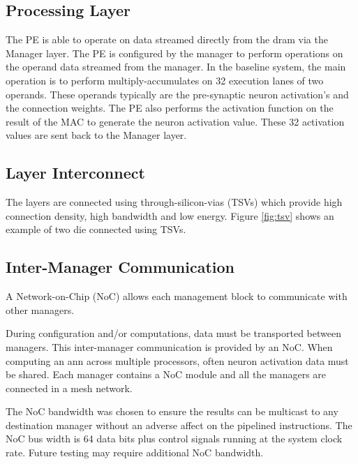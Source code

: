 \documentclass[journal]{IEEEtran}
\begin{document}
\subsection{Processing Layer}
\label{ssec:Processing Layer}
The PE is able to operate on data streamed directly from the \ac{dram} via the Manager layer. The PE is configured by the manager to perform operations on the operand data streamed from the manager. In the baseline system, the main operation is to perform multiply-accumulates on 32 execution lanes of two operands. These operands typically are the pre-synaptic neuron activation's and the connection weights. The PE also performs the activation function on the result of the MAC to generate the neuron activation value. These 32 activation values are sent back to the Manager layer.

\subsection{Layer Interconnect}
\label{ssec:Layer Interconnect}

The layers are connected using through-silicon-vias (TSVs) which provide high connection density, high bandwidth and low energy.
Figure \ref{fig:tsv} shows an example of two die connected using TSVs.

\subsection{Inter-Manager Communication}
\label{ssec:Inter-Manager Communication}

A Network-on-Chip (NoC) allows each management block to communicate with other managers.

During configuration and/or computations, data must be transported between managers. This inter-manager communication is provided by an NoC.
When computing an \ac{ann} across multiple processors, often neuron activation data must be shared. 
Each manager contains a NoC module and all the managers are connected in a mesh network.

The NoC bandwidth was chosen to ensure the results can be multicast to any destination manager without an adverse affect on the pipelined instructions.
The NoC bus width is 64 data bits plus control signals running at the system clock rate. Future testing may require additional NoC bandwidth.
\end{document}
